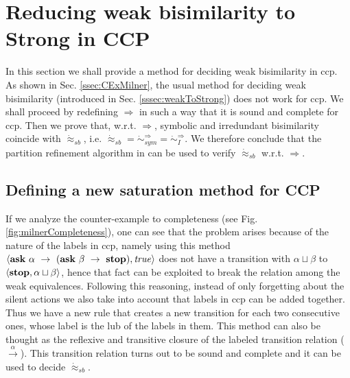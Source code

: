 \documentclass[copyright,creativecommons]{eptcs}
\newcommand{\askp}[2]{\ask \  #1 \  \rightarrow \ #2}
\newcommand{\true}{{\it true}}
\newcommand{\ask}{{\bf ask}}
\newcommand{\Stop}{{\bf stop}}
\newcommand{\rrarrow}{\longrightarrow}
\newcommand{\pairccp}[2]{\langle #1,#2 \rangle}
\newcommand{\trans}[1]{\stackrel{#1}{\rrarrow}}
\newcommand{\wsatbis}{\dot{\approx}_{sb}}
\newcommand{\newtrans}[1]{\stackrel{#1}{\Longrightarrow}}
\newcommand{\A}{\alpha}
\newcommand{\B}{\beta}
\newcommand{\conf}[2]{\pairccp{#1}{#2}}
\newcommand{\lub}{\sqcup}
\newcommand{\newirrbis}{\dot{\sim}^{\newtrans{}}_{I}}
\newcommand{\newsymbis}{\dot{\sim}^{\newtrans{}}_{sym}}
\begin{document}
\section{Reducing weak bisimilarity to Strong in CCP} \label{sec:weakCCP}

In this section we shall provide a method for deciding weak bisimilarity in ccp.
As shown in Sec. \ref{ssec:CExMilner}, the usual method for deciding weak bisimilarity
(introduced in Sec. \ref{sssec:weakToStrong}) does not work for ccp.
We shall proceed by redefining $\newtrans{}$ in such a way that it is sound and complete for ccp.
Then we prove that, w.r.t. $\newtrans{}$, symbolic and irredundant bisimilarity
coincide with $\wsatbis$, i.e. $\wsatbis = \newsymbis = \newirrbis$.
We therefore conclude that the partition refinement algorithm in \cite{Aristizabal:12:SAC}
can be used to verify $\wsatbis$ w.r.t. $\newtrans{}$.







\subsection{Defining a new saturation method for CCP} \label{ssec:newLTS}

If we analyze the counter-example to completeness (see Fig. \ref{fig:milnerCompleteness}),
one can see that the problem arises because of the nature of
the labels in ccp, namely using this method $\conf{\askp{\A}{(\askp{\B}{\Stop})}}{\true}$
does not have a transition with $\A \lub \B$ to $\conf{\Stop}{\A \lub \B}$, hence
that fact can be exploited to break the relation among the weak equivalences.
Following this reasoning, instead of only forgetting about the silent actions
we also take into account that labels in ccp can be added together. Thus we
have a new rule that creates a new transition for each two consecutive ones,
whose label is the lub of the labels in them. This method
can also be thought as the reflexive and transitive closure of the
labeled transition relation ($\trans{\A}$). This transition relation
turns out to be sound and complete and it can be used to decide $\wsatbis$.
\end{document}
